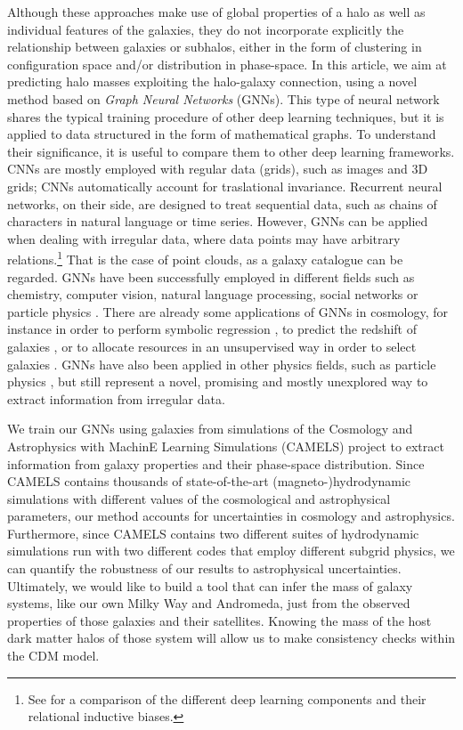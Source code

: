 \documentclass[twocolumn]{aastex631}
\begin{document}
Although these approaches make use of global properties of a halo as well as individual features of the galaxies, they do not incorporate explicitly the relationship between galaxies or subhalos, either in the form of clustering in configuration space and/or distribution in phase-space. In this article, we aim at predicting halo masses exploiting the halo-galaxy connection, using a novel method based on \textit{Graph Neural Networks} (GNNs). This type of neural network shares the typical training procedure of other deep learning techniques, but it is applied to data structured in the form of mathematical graphs. To understand their significance, it is useful to compare them to other deep learning frameworks. CNNs are mostly employed with regular data (grids), such as images and 3D grids; CNNs automatically account for traslational invariance. Recurrent neural networks, on their side, are designed to treat sequential data, such as chains of characters in natural language or time series. However, GNNs can be applied when dealing with irregular data, where data points may have arbitrary relations.\footnote{See \cite{2018arXiv180601261B} for a comparison of the different deep learning components and their relational inductive biases.} That is the case of point clouds, as a galaxy catalogue can be regarded. GNNs have been successfully employed in different fields such as chemistry, computer vision, natural language processing, social networks or particle physics \citep{2019arXiv190100596W, 2021arXiv210413478B}. There are already some applications of GNNs in cosmology, for instance in order to perform symbolic regression \citep{2019arXiv190905862C, Cranmer:2020wew}, to predict the redshift of galaxies \citep{Beck2019RefinedRR}, or to allocate resources in an unsupervised way in order to select galaxies \citep{Cranmer:2021pve}. GNNs have also been applied in other physics fields, such as particle physics \citep{Shlomi:2020gdn}, but still represent a novel, promising and mostly unexplored way to extract information from irregular data.

We train our GNNs using galaxies from simulations of the Cosmology and Astrophysics with MachinE Learning Simulations (CAMELS) project \citep{villaescusanavarro2020camels} to extract information from galaxy properties and their phase-space distribution. Since CAMELS contains thousands of state-of-the-art (magneto-)hydrodynamic simulations with different values of the cosmological and astrophysical parameters, our method accounts for uncertainties in cosmology and astrophysics. Furthermore, since CAMELS contains two different suites of hydrodynamic simulations run with two different codes that employ different subgrid physics, we can quantify the robustness of our results to astrophysical uncertainties. Ultimately, we would like to build a tool that can infer the mass of galaxy systems, like our own Milky Way and Andromeda, just from the observed properties of those galaxies and their satellites. Knowing the mass of the host dark matter halos of those system will allow us to make consistency checks within the CDM model.
\end{document}
